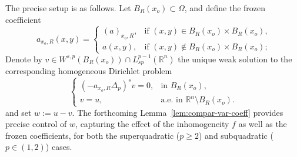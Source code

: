 \documentclass[10pt,letterpaper]{amsart}
\theoremstyle{definition}
\numberwithin{theorem}{section}
\numberwithin{equation}{section}
\newcommand{\R}{\ensuremath{\mathbb{R}}}
\newcommand{\1}{\ensuremath{\mathds{1}}}
\numberwithin{equation}{section}
\begin{document}
The precise setup is as follows. Let $B_R(x_o)\subset\Omega$, and define the frozen coefficient
\begin{equation}\label{def:frozen} 
a_{x_o,R}(x,y)=
\left\{
    \begin{array}{cl}
      (a)_{x_o,R}, & \mbox{if $(x,y)\in B_R(x_o)\times B_R(x_o)$,} \\[6pt]
      a(x,y), & \mbox{if $(x,y)\notin B_R(x_o)\times B_R(x_o)$;}
    \end{array}
\right.
\end{equation}
Denote by $v \in W^{s,p}(B_R(x_o)) \cap L^{p-1}_{sp}(\R^n)$ the unique weak solution to the corresponding homogeneous Dirichlet problem
\begin{equation}\label{CD-homo-a} 
\left\{
    \begin{array}{cl}
      (- a_{x_o,R}\Delta_p)^s v  = 0, & \mbox{in $B_R(x_o)$,} \\[6pt]
      v = u, & \mbox{a.e.~in $\R^n \setminus B_R(x_o)$.}
    \end{array}
\right.
\end{equation}
and set $w := u-v$. The forthcoming Lemma~\ref{lem:compar-var-coeff} provides precise control of $w$, 
capturing the effect of the inhomogeneity $f$ as well as the frozen coefficients, 
for both the superquadratic ($p\ge 2$) and subquadratic ($p\in(1,2)$) cases.
\end{document}
